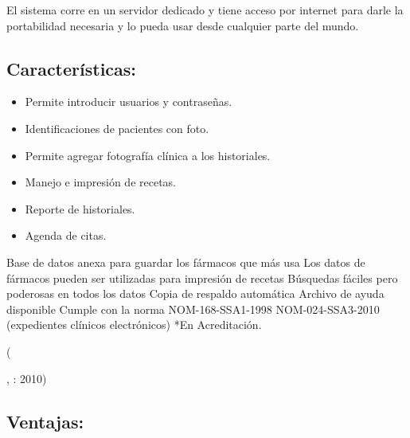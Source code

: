 El sistema corre en un servidor dedicado y tiene acceso por internet para darle la portabilidad necesaria y lo pueda usar desde cualquier parte del mundo.
\subsection{Características:}
  \begin{itemize}
    \item Permite introducir usuarios y contraseñas.
    \item Identificaciones de pacientes con foto.
    \item Permite agregar fotografía clínica a los historiales.
    \item Manejo e impresión de recetas.
    \item Reporte de historiales.
    \item Agenda de citas.

  \end{itemize}

  \begin{center}
    \begin{minipage}{0.9\linewidth}
      \vspace{5pt}%
      {\small
      Base de datos anexa para guardar los fármacos que más usa
      Los datos de fármacos pueden ser utilizadas para impresión de recetas
      Búsquedas fáciles pero poderosas en todos los datos
      Copia de respaldo automática
      Archivo de ayuda disponible
      Cumple con la norma NOM-168-SSA1-1998
      NOM-024-SSA3-2010 (expedientes clínicos electrónicos) *En Acreditación.
      }
      \begin{flushright}
        (\author{Elex},
        : 2010)
      \end{flushright}
        \vspace{5pt}%
    \end{minipage}
  \end{center}

\subsection{Ventajas:}


